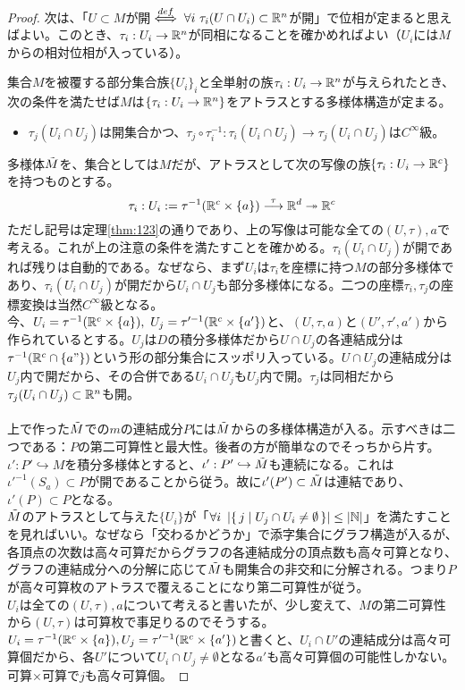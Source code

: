 \begin{proof}
    次は、「$U\subset M$が開$\overset{def}{\iff}\forall i\ \tau_i(U\cap U_i)\subset\mathbb{R}^n$が開」で位相が定まると思えばよい。このとき、$\tau_i:U_i\to\mathbb{R}^n$が同相になることを確かめればよい（$U_i$には$M$からの相対位相が入っている）。
    \begin{rem}[多様体の定義]
        集合$M$を被覆する部分集合族$\{U_i\}_i$と全単射の族$\tau_i:U_i\to\mathbb{R}^n$が与えられたとき、次の条件を満たせば$M$は$\{\tau_i:U_i\to\mathbb{R}^n\}$をアトラスとする多様体構造が定まる。
        \begin{itemize}
            \item $\tau_j(U_i\cap U_j)$は開集合かつ、$\tau_j\circ\tau_i^{-1}:\tau_i(U_i\cap U_j)\to\tau_j(U_i\cap U_j)$は$C^\infty$級。
        \end{itemize}
    \end{rem}
    多様体$\Tilde{M}$を、集合としては$M$だが、アトラスとして次の写像の族$\{\tau_i:U_i\to\mathbb{R}^c\}$を持つものとする。
    \[\tau_i:U_i:=\tau^{-1}(\mathbb{R}^c\times\{a\})\overset{\tau}{\longrightarrow}\mathbb{R}^d\twoheadrightarrow\mathbb{R}^c\]
    ただし記号は定理\ref{thm:123}の通りであり、上の写像は可能な全ての$(U,\tau),a$で考える。これが上の注意の条件を満たすことを確かめる。$\tau_i(U_i\cap U_j)$が開であれば残りは自動的である。なぜなら、まず$U_i$は$\tau_i$を座標に持つ$M$の部分多様体であり、$\tau_i(U_i\cap U_j)$が開だから$U_i\cap U_j$も部分多様体になる。二つの座標$\tau_i,\tau_j$の座標変換は当然$C^\infty$級となる。\\
    今、$U_i=\tau^{-1}(\R^c\times\{a\}),\ U_j=\tau'^{-1}(\R^c\times\{a'\})$と、$(U,\tau,a)$と$(U',\tau',a')$から作られているとする。$U_j$は$D$の積分多様体だから$U\cap U_j$の各連結成分は$\tau^{-1}(\mathbb{R}^c\cap\{a"\})$という形の部分集合にスッポリ入っている。$U\cap U_j$の連結成分は$U_j$内で開だから、その合併である$U_i\cap U_j$も$U_j$内で開。$\tau_j$は同相だから$\tau_j(U_i\cap U_j)\subset\mathbb{R}^n$も開。\\
    \ \\
    上で作った$\Tilde{M}$での$m$の連結成分$P$には$\Tilde{M}$からの多様体構造が入る。示すべきは二つである：$P$の第二可算性と最大性。後者の方が簡単なのでそっちから片す。\\
    $\iota':P'\hookrightarrow M$を積分多様体とすると、$\iota':P'\hookrightarrow \Tilde{M}$も連続になる。これは$\iota'^{-1}(S_a)\subset P$が開であることから従う。故に$\iota'(P')\subset\Tilde{M}$は連結であり、$\iota'(P)\subset P$となる。\\
    $\Tilde{M}$のアトラスとして与えた$\{U_i\}$が「$\forall i\ \left\lvert\{\, j\mid U_j\cap U_i\neq\emptyset\,\}\right\rvert\leq\left\lvert\mathbb{N}\right\rvert$」を満たすことを見ればいい。なぜなら「交わるかどうか」で添字集合にグラフ構造が入るが、各頂点の次数は高々可算だからグラフの各連結成分の頂点数も高々可算となり、グラフの連結成分への分解に応じて$\Tilde{M}$も開集合の非交和に分解される。つまり$P$が高々可算枚のアトラスで覆えることになり第二可算性が従う。\\
    $U_i$は全ての$(U,\tau),a$について考えると書いたが、少し変えて、$M$の第二可算性から$(U,\tau)$は可算枚で事足りるのでそうする。$U_i=\tau^{-1}(\mathbb{R}^c\times\{a\}),U_j=\tau'^{-1}(\mathbb{R}^c\times\{a'\})$と書くと、$U_i\cap U'$の連結成分は高々可算個だから、各$U'$について$U_i\cap U_j\neq\emptyset$となる$a'$も高々可算個の可能性しかない。可算×可算で$j$も高々可算個。
\end{proof}

